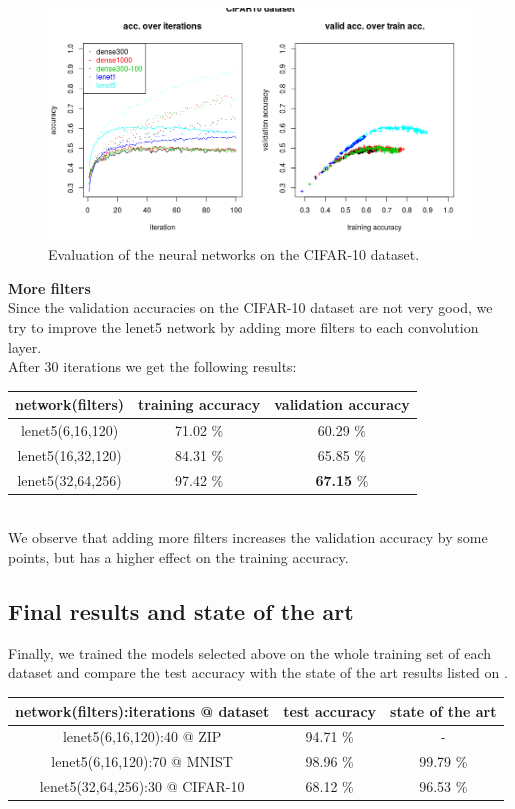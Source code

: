 \begin{figure}
 \includegraphics[width=\textwidth]{../plots/nn_cifar10}
 \caption{Evaluation of the neural networks on the CIFAR-10 dataset.}
 \label{cifar10_plots}
\end{figure}

\textbf{More filters}\\

Since the validation accuracies on the CIFAR-10 dataset are not very good, we try to improve the lenet5
network by adding more filters to each convolution layer.\\

After 30 iterations we get the following results:\\

\begin{tabular}{|c|c|c|}
 \hline
 network(filters) & training accuracy & validation accuracy\\ \hline
 lenet5(6,16,120) & 71.02 \% & 60.29 \% \\
 lenet5(16,32,120) & 84.31 \% & 65.85 \% \\
 lenet5(32,64,256) & 97.42 \% & \textbf{67.15} \% \\
 \hline
\end{tabular}\\

We observe that adding more filters increases the validation accuracy
by some points, but has a higher effect on the training accuracy.


\subsection{Final results and state of the art}

Finally, we trained the models selected above on the whole training
set of each dataset and compare the test accuracy with
the state of the art results listed on \cite{state-of-art}.\\

\begin{tabular}{|c|c|c|}
 \hline
 network(filters):iterations @ dataset & test accuracy & state of the art\\ \hline
 lenet5(6,16,120):40 @ ZIP & 94.71 \% & - \\
 lenet5(6,16,120):70 @ MNIST & 98.96 \% & 99.79 \% \\
 lenet5(32,64,256):30 @ CIFAR-10 & 68.12 \% & 96.53 \% \\
 \hline
\end{tabular}
